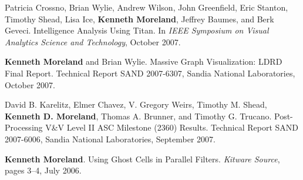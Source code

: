 \begin{enumerate}[label={[\arabic*]}, left=0pt]
  Patricia Crossno, Brian Wylie, Andrew Wilson, John Greenfield, Eric Stanton, Timothy Shead, Lisa Ice, \textbf{Kenneth Moreland}, Jeffrey Baumes, and Berk Geveci.
  Intelligence Analysis Using Titan.
  In \emph{IEEE Symposium on Visual Analytics Science and Technology}, October 2007.
\item  %
  \textbf{Kenneth Moreland} and Brian Wylie.
  Massive Graph Visualization: LDRD Final Report.
Technical Report SAND 2007-6307, Sandia National Laboratories, October 2007.
\item  %
  David B. Karelitz, Elmer Chavez, V. Gregory Weirs, Timothy M. Shead, \textbf{Kenneth D. Moreland}, Thomas A. Brunner, and Timothy G. Trucano.
  Post-Processing {V\&V} Level {II} {ASC} Milestone (2360) Results.
Technical Report SAND 2007-6006, Sandia National Laboratories, September 2007.
\item  %
  \textbf{Kenneth Moreland}.
  Using Ghost Cells in Parallel Filters.
  \emph{Kitware Source}, pages 3--4, July 2006.
\end{enumerate}